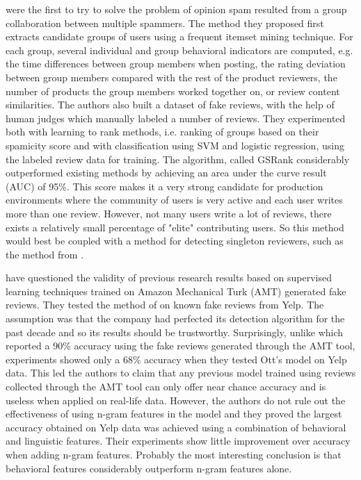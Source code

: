 \citet{Mukherjee2012} were the first to try to solve the problem of opinion spam resulted from a group collaboration between multiple spammers. The method they proposed first extracts candidate groups of users using a frequent itemset mining technique. For each group, several individual and group behavioral indicators are computed, e.g. the time differences between group members when posting, the rating deviation between group members compared with the rest of the product reviewers, the number of products the group members worked together on, or review content similarities. The authors also built a dataset of fake reviews, with the help of human judges which manually labeled a number of reviews. They experimented both with learning to rank methods, i.e. ranking of groups based on their spamicity score and with classification using SVM and logistic regression, using the labeled review data for training. The algorithm, called GSRank considerably outperformed existing methods by achieving an area under the curve result (AUC) of 95\%. This score makes it a very strong candidate for production environments where the community of users is very active and each user writes more than one review. However, not many users write a lot of reviews, there exists a relatively small percentage of "elite" contributing users. So this method would best be coupled with a method for detecting singleton reviewers, such as the method from \citet{Xie2012}. 

\citet{Mukherjee2013b} have questioned the validity of previous research results based on supervised learning techniques trained on Amazon Mechanical Turk (AMT) generated fake reviews. They tested the method of \citet{Ott2011} on known fake reviews from Yelp. The assumption was that the company had perfected its detection algorithm for the past decade and so its results should be trustworthy. Surprisingly, unlike \citet{Ott2011} which reported a 90\% accuracy using the fake reviews generated through the AMT tool, \citet{Mukherjee2013b} experiments showed only a 68\% accuracy when they tested Ott's model on Yelp data. This led the authors to claim that any previous model trained using reviews collected through the AMT tool can only offer near chance accuracy and is useless when applied on real-life data. However, the authors do not rule out the effectiveness of using n-gram features in the model and they proved the largest accuracy obtained on Yelp data was achieved using a combination of behavioral and linguistic features. Their experiments show little improvement over accuracy when adding n-gram features. Probably the most interesting conclusion is that behavioral features considerably outperform n-gram features alone. 

